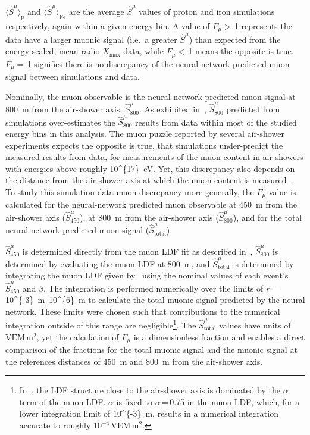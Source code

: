 \noindent
$\langle \hat{S}^{\mu}\rangle_{\text{p}}$ and $\langle \hat{S}^{\mu}\rangle_{\text{Fe}}$ are the average $\hat{S}^{\mu}$ values of proton and iron simulations respectively, again within a given energy bin.
A value of $F_{\mu}>$\,1 represents the data have a larger muonic signal (i.e.~a greater $\hat{S}^{\mu}$) than expected from the energy scaled, mean radio $X_{\text{max}}$ data, while $F_{\mu}<$\,1 means the opposite is true.
$F_{\mu}=$\,1 signifies there is no discrepancy of the neural-network predicted muon signal between simulations and data. 

Nominally, the muon observable is the neural-network predicted muon signal at \qty{800}{\meter} from the air-shower axis, $\hat{S}^{\mu}_{800}$.
As exhibited in~, $\hat{S}^{\mu}_{800}$ predicted from simulations over-estimates the $\hat{S}^{\mu}_{800}$ results from data within most of the studied energy bins in this analysis.
The muon puzzle reported by several air-shower experiments expects the opposite is true, that simulations under-predict the measured results from data, for measurements of the muon content in air showers with energies above roughly \qty[parse-numbers=false]{10^{17}}{\electronvolt}.
Yet, this discrepancy also depends on the distance from the air-shower axis at which the muon content is measured~\cite{icrc2023_arteaga_muonpuzzle}.
To study this simulation-data muon discrepancy more generally, the $F_{\mu}$ value is calculated for the neural-network predicted muon observable at \qty{450}{\meter} from the air-shower axis ($\hat{S}^{\mu}_{450}$), at \qty{800}{\meter} from the air-shower axis ($\hat{S}^{\mu}_{800}$), and for the total neural-network predicted muon signal ($\hat{S}^{\mu}_{\text{total}}$).

$\hat{S}^{\mu}_{450}$ is determined directly from the muon LDF fit as described in~, $\hat{S}^{\mu}_{800}$ is determined by evaluating the muon LDF at \qty{800}{\meter}, and $\hat{S}^{\mu}_{\text{total}}$ is determined by integrating the muon LDF given by~ using the nominal values of each event's $\hat{S}^{\mu}_{450}$ and $\beta$.
The integration is performed numerically over the limits of $r$\,=\,\qtyrange[parse-numbers=false]{10^{-3}}{10^{6}}{\meter} to calculate the total muonic signal predicted by the neural network.
These limits were chosen such that contributions to the numerical integration outside of this range are negligible\footnote[3]{In~, the LDF structure close to the air-shower axis is dominated by the $\alpha$ term of the muon LDF. $\alpha$ is fixed to $\alpha$\,=\,0.75 in the muon LDF, which, for a lower integration limit of \qty[parse-numbers=false]{10^{-3}}{\meter}, results in a numerical integration accurate to roughly $10^{-4}\,\text{VEM}\,\text{m}^{2}$.}.
The $\hat{S}^{\mu}_{\text{total}}$ values have units of $\text{VEM}\,\text{m}^{2}$, yet the calculation of $F_{\mu}$ is a dimensionless fraction and enables a direct comparison of the fractions for the total muonic signal and the muonic signal at the references distances of \qty{450}{\meter} and \qty{800}{\meter} from the air-shower axis.

